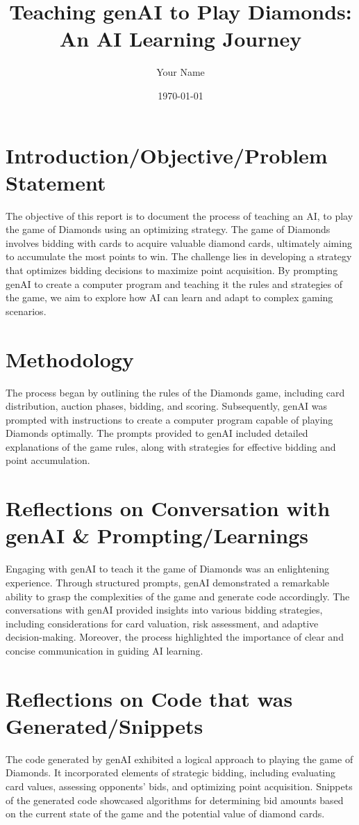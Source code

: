 \documentclass{article}
\title{Teaching genAI to Play Diamonds: An AI Learning Journey}
\author{Your Name}
\date{\today}
\begin{document}
\maketitle

\section*{Introduction/Objective/Problem Statement}
The objective of this report is to document the process of teaching an AI, to play the game of Diamonds using an optimizing strategy. The game of Diamonds involves bidding with cards to acquire valuable diamond cards, ultimately aiming to accumulate the most points to win. The challenge lies in developing a strategy that optimizes bidding decisions to maximize point acquisition. By prompting genAI to create a computer program and teaching it the rules and strategies of the game, we aim to explore how AI can learn and adapt to complex gaming scenarios.

\section*{Methodology}
The process began by outlining the rules of the Diamonds game, including card distribution, auction phases, bidding, and scoring. Subsequently, genAI was prompted with instructions to create a computer program capable of playing Diamonds optimally. The prompts provided to genAI included detailed explanations of the game rules, along with strategies for effective bidding and point accumulation.

\section*{Reflections on Conversation with genAI \& Prompting/Learnings}
Engaging with genAI to teach it the game of Diamonds was an enlightening experience. Through structured prompts, genAI demonstrated a remarkable ability to grasp the complexities of the game and generate code accordingly. The conversations with genAI provided insights into various bidding strategies, including considerations for card valuation, risk assessment, and adaptive decision-making. Moreover, the process highlighted the importance of clear and concise communication in guiding AI learning.

\section*{Reflections on Code that was Generated/Snippets}
The code generated by genAI exhibited a logical approach to playing the game of Diamonds. It incorporated elements of strategic bidding, including evaluating card values, assessing opponents' bids, and optimizing point acquisition. Snippets of the generated code showcased algorithms for determining bid amounts based on the current state of the game and the potential value of diamond cards.
\end{document}
